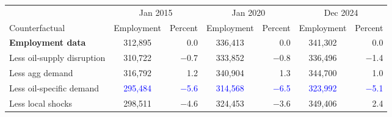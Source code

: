 
\begin{tabular}{lcrcrcr}
\toprule
\multicolumn{1}{c}{ } & \multicolumn{2}{c}{Jan 2015} & \multicolumn{2}{c}{Jan 2020} & \multicolumn{2}{c}{Dec 2024} \\
\cmidrule(l{3pt}r{3pt}){2-3} \cmidrule(l{3pt}r{3pt}){4-5} \cmidrule(l{3pt}r{3pt}){6-7}
Counterfactual & Employment & Percent & Employment & Percent & Employment & Percent\\
\midrule
\textbf{Employment data} & 312,895 & 0.0 & 336,413 & 0.0 & 341,302 & 0.0\\
Less oil-supply disruption & 310,722 & $-$0.7 & 333,852 & $-$0.8 & 336,496 & $-$1.4\\
Less agg demand & 316,792 & 1.2 & 340,904 & 1.3 & 344,700 & 1.0\\
Less oil-specific demand & \textcolor{blue}{295,484} & \textcolor{blue}{$-$5.6} & \textcolor{blue}{314,568} & \textcolor{blue}{$-$6.5} & \textcolor{blue}{323,992} & \textcolor{blue}{$-$5.1}\\
Less local shocks & 298,511 & $-$4.6 & 324,453 & $-$3.6 & 349,406 & 2.4\\
\bottomrule
\end{tabular}
